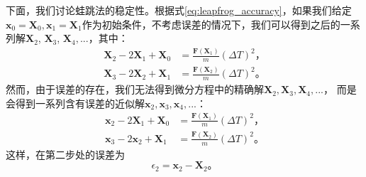 {下面，我们讨论蛙跳法的稳定性。根据式\eqref{eq:leapfrog_accuracy}，如果我们给定$\mathbf{x}_0 = \mathbf{X}_0,\mathbf{x}_1 = \mathbf{X}_1$作为初始条件，不考虑误差的情况下，我们可以得到之后的一系列解$\mathbf{X}_2$, $\mathbf{X}_3$, $\mathbf{X}_4,...$，其中：
      \begin{align}
         \label{eq:leapfrog_stability1}
         \mathbf{X}_{2}-2\mathbf{X}_{1}+\mathbf{X}_{0} &= \frac{\mathbf{F}(\mathbf{X}_1)}{m} {(\Delta T)^2} \text{，} \\
         \label{eq:leapfrog_stability2}
         \mathbf{X}_{3}-2\mathbf{X}_{2}+\mathbf{X}_{1} &= \frac{\mathbf{F}(\mathbf{X}_2)}{m} {(\Delta T)^2} \text{。}
      \end{align}
然而，由于误差的存在，我们无法得到微分方程中的精确解$\mathbf{X}_2,\mathbf{X}_3,\mathbf{X}_4,...$，
而是会得到一系列含有误差的近似解$\mathbf{x}_2,\mathbf{x}_3,\mathbf{x}_4,...$：
      \begin{align}
         \label{eq:leapfrog_stability3}
         \mathbf{x}_{2}-2\mathbf{X}_{1}+\mathbf{X}_{0} &= \frac{\mathbf{F}(\mathbf{X}_1)}{m} {(\Delta T)^2} \text{，} \\
         \label{eq:leapfrog_stability4}
         \mathbf{x}_{3}-2\mathbf{x}_{2}+\mathbf{X}_{1} &= \frac{\mathbf{F}(\mathbf{X}_2)}{m} {(\Delta T)^2} \text{。}
      \end{align}
这样，在第二步处的误差为
      \begin{equation}
         \label{eq:leapfrog_stability5}
         {\epsilon}_2 = \mathbf{x}_2 -\mathbf{X}_2 \text{。}
      \end{equation}

}
